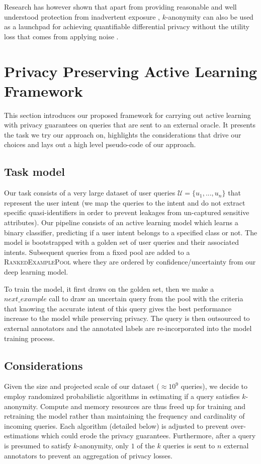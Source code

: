 \documentclass[letterpaper]{article}
\begin{document}
Research has however shown that apart from providing reasonable and well understood protection from inadvertent exposure \cite{di2016enforcing},  $k$-anonymity can also be used as a launchpad for achieving quantifiable differential privacy without the utility loss that comes from applying noise \cite{li2012sampling,soria2014enhancing}.



\section{Privacy Preserving Active Learning Framework}
This section introduces our proposed framework for carrying out active learning with privacy guarantees on queries that are sent to an external oracle. It presents the task we try our approach on, highlights the considerations that drive our choices and lays out a high level pseudo-code of our approach.

\subsection{Task model}
Our task consists of a very large dataset of user queries $\mathcal{U} = \{u_1,...,u_n\}$ that represent the user intent (we map the queries to the intent and do not extract specific quasi-identifiers in order to prevent leakages from un-captured sensitive attributes). Our pipeline consists of an active learning model which learns a binary classifier, predicting if a user intent belongs to a specified class or not. The model is bootstrapped with a golden set of user queries and their associated intents. Subsequent queries from a fixed pool are added to a \textsc{RankedExamplePool} where they are ordered by confidence/uncertainty \cite{gal2016dropout} from our deep learning model.

To train the model, it first draws on the golden set, then we make a $next\_example$ call to draw an uncertain query from the pool with the criteria that knowing the accurate intent of this query gives the best performance increase to the model while preserving privacy. The query is then outsourced to external annotators and the annotated labels are re-incorporated into the model training process.

\subsection{Considerations}
Given the size and projected scale of our dataset ($\approx 10^9$ queries), we decide to employ randomized probabilistic algorithms in estimating if a query satisfies $k$-anonymity. Compute and memory resources are thus freed up for training and retraining the model rather than maintaining the frequency and cardinality of incoming queries. Each algorithm (detailed below) is adjusted to prevent over-estimations which could erode the privacy guarantees. Furthermore, after a query is presumed to satisfy $k$-anonymity, only $1$ of the $k$ queries is sent to $n$ external annotators to prevent an aggregation of privacy losses.
\end{document}
